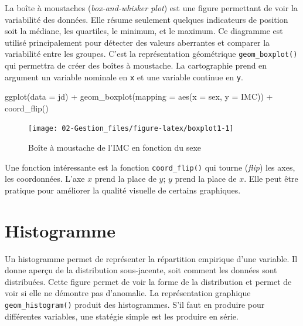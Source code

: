 \documentclass[
]{book}
\newenvironment{Shaded}{}{}
\newcommand{\AttributeTok}[1]{#1}
\newcommand{\FunctionTok}[1]{#1}
\newcommand{\NormalTok}[1]{#1}
\newcommand{\SpecialCharTok}[1]{#1}
\begin{document}
La boîte à moustaches (\emph{box-and-whisker plot}) est une figure permettant de voir la variabilité des données. Elle résume seulement quelques indicateurs de position soit la médiane, les quartiles, le minimum, et le maximum. Ce diagramme est utilisé principalement pour détecter des valeurs aberrantes et comparer la variabilité entre les groupes. C'est la représentation géométrique \texttt{geom\_boxplot()} qui permettra de créer des boîtes à moustache. La cartographie prend en argument un variable nominale en \texttt{x} et une variable continue en \texttt{y}.

\begin{Shaded}
\begin{Highlighting}[]
\FunctionTok{ggplot}\NormalTok{(}\AttributeTok{data =}\NormalTok{ jd) }\SpecialCharTok{+} 
  \FunctionTok{geom\_boxplot}\NormalTok{(}\AttributeTok{mapping =} \FunctionTok{aes}\NormalTok{(}\AttributeTok{x =}\NormalTok{ sex, }\AttributeTok{y =}\NormalTok{ IMC)) }\SpecialCharTok{+}
  \FunctionTok{coord\_flip}\NormalTok{()}
\end{Highlighting}
\end{Shaded}

\begin{figure}

{\centering \texttt{[image: 02-Gestion\_files/figure-latex/boxplot1-1]} 

}

\caption{Boîte à moustache de l'IMC en fonction du sexe}\label{fig:boxplot1}
\end{figure}

Une fonction intéressante est la fonction \texttt{coord\_flip()} qui tourne (\emph{flip}) les axes, les coordonnées. L'axe \(x\) prend la place de \(y\); \(y\) prend la place de \(x\). Elle peut être pratique pour améliorer la qualité visuelle de certains graphiques.

\hypertarget{histogramme}{%
\section{Histogramme}\label{histogramme}}

Un histogramme permet de représenter la répartition empirique d'une variable. Il donne aperçu de la distribution sous-jacente, soit comment les données sont distribuées. Cette figure permet de voir la forme de la distribution et permet de voir si elle ne démontre pas d'anomalie. La représentation graphique \texttt{geom\_histogram()} produit des histogrammes. S'il faut en produire pour différentes variables, une statégie simple est les produire en série.
\end{document}
